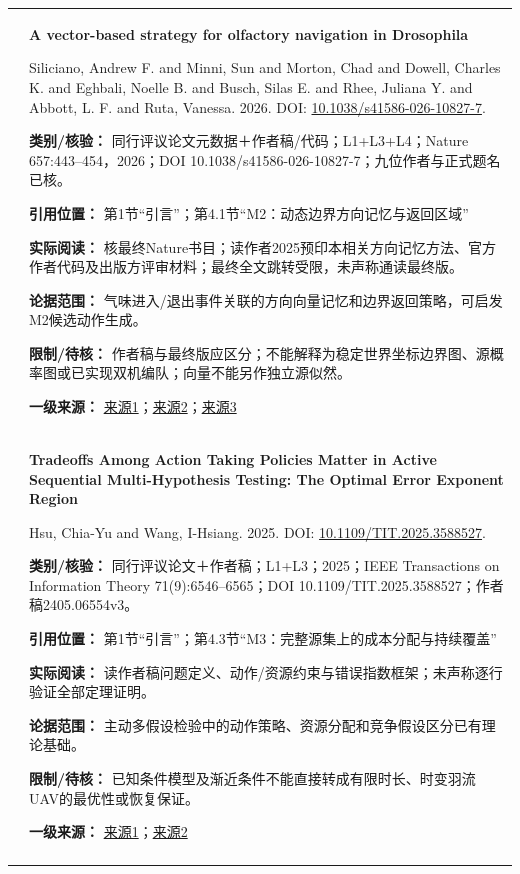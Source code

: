 \begin{longtable}{@{}>{\raggedright\arraybackslash}p{0.7cm}>{\raggedright\arraybackslash}p{14.8cm}@{}}
16 & \textbf{A vector-based strategy for olfactory navigation in Drosophila}\par Siliciano, Andrew F. and Minni, Sun and Morton, Chad and Dowell, Charles K. and Eghbali, Noelle B. and Busch, Silas E. and Rhee, Juliana Y. and Abbott, L. F. and Ruta, Vanessa. 2026. DOI: \url{10.1038/s41586-026-10827-7}. \par\textbf{类别/核验：} 同行评议论文元数据＋作者稿/代码；L1+L3+L4；Nature 657:443–454，2026；DOI 10.1038/s41586-026-10827-7；九位作者与正式题名已核。\par\textbf{引用位置：} 第1节“引言”；第4.1节“M2：动态边界方向记忆与返回区域”\par\textbf{实际阅读：} 核最终Nature书目；读作者2025预印本相关方向记忆方法、官方作者代码及出版方评审材料；最终全文跳转受限，未声称通读最终版。\par\textbf{论据范围：} 气味进入/退出事件关联的方向向量记忆和边界返回策略，可启发M2候选动作生成。\par\textbf{限制/待核：} 作者稿与最终版应区分；不能解释为稳定世界坐标边界图、源概率图或已实现双机编队；向量不能另作独立源似然。\par\textbf{一级来源：} \href{https://www.nature.com/articles/s41586-026-10827-7}{来源1}；\href{https://pmc.ncbi.nlm.nih.gov/articles/PMC11844514/}{来源2}；\href{https://github.com/rutalaboratory/Edge-Tracking-Model}{来源3} \\\addlinespace[6pt]
17 & \textbf{Tradeoffs Among Action Taking Policies Matter in Active Sequential Multi-Hypothesis Testing: The Optimal Error Exponent Region}\par Hsu, Chia-Yu and Wang, I-Hsiang. 2025. DOI: \url{10.1109/TIT.2025.3588527}. \par\textbf{类别/核验：} 同行评议论文＋作者稿；L1+L3；2025；IEEE Transactions on Information Theory 71(9):6546–6565；DOI 10.1109/TIT.2025.3588527；作者稿2405.06554v3。\par\textbf{引用位置：} 第1节“引言”；第4.3节“M3：完整源集上的成本分配与持续覆盖”\par\textbf{实际阅读：} 读作者稿问题定义、动作/资源约束与错误指数框架；未声称逐行验证全部定理证明。\par\textbf{论据范围：} 主动多假设检验中的动作策略、资源分配和竞争假设区分已有理论基础。\par\textbf{限制/待核：} 已知条件模型及渐近条件不能直接转成有限时长、时变羽流UAV的最优性或恢复保证。\par\textbf{一级来源：} \href{https://arxiv.org/html/2405.06554v3}{来源1}；\href{https://cc.ee.ntu.edu.tw/~ihsiangw/NICLab/Publications.html}{来源2} \\\addlinespace[6pt]

\end{longtable}
